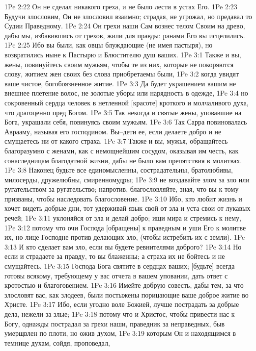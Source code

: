 1Pe 2:22  Он не сделал никакого греха, и не было лести в устах Его.
1Pe 2:23  Будучи злословим, Он не злословил взаимно; страдая, не угрожал, но предавал то Судии Праведному.
1Pe 2:24  Он грехи наши Сам вознес телом Своим на древо, дабы мы, избавившись от грехов, жили для правды: ранами Его вы исцелились.
1Pe 2:25  Ибо вы были, как овцы блуждающие (не имея пастыря), но возвратились ныне к Пастырю и Блюстителю душ ваших.
1Pe 3:1  Также и вы, жены, повинуйтесь своим мужьям, чтобы те из них, которые не покоряются слову, житием жен своих без слова приобретаемы были,
1Pe 3:2  когда увидят ваше чистое, богобоязненное житие.
1Pe 3:3  Да будет украшением вашим не внешнее плетение волос, не золотые уборы или нарядность в одежде,
1Pe 3:4  но сокровенный сердца человек в нетленной [красоте] кроткого и молчаливого духа, что драгоценно пред Богом.
1Pe 3:5  Так некогда и святые жены, уповавшие на Бога, украшали себя, повинуясь своим мужьям.
1Pe 3:6  Так Сарра повиновалась Аврааму, называя его господином. Вы--дети ее, если делаете добро и не смущаетесь ни от какого страха.
1Pe 3:7  Также и вы, мужья, обращайтесь благоразумно с женами, как с немощнейшим сосудом, оказывая им честь, как сонаследницам благодатной жизни, дабы не было вам препятствия в молитвах.
1Pe 3:8  Наконец будьте все единомысленны, сострадательны, братолюбивы, милосерды, дружелюбны, смиренномудры;
1Pe 3:9  не воздавайте злом за зло или ругательством за ругательство; напротив, благословляйте, зная, что вы к тому призваны, чтобы наследовать благословение.
1Pe 3:10  Ибо, кто любит жизнь и хочет видеть добрые дни, тот удерживай язык свой от зла и уста свои от лукавых речей;
1Pe 3:11  уклоняйся от зла и делай добро; ищи мира и стремись к нему,
1Pe 3:12  потому что очи Господа [обращены] к праведным и уши Его к молитве их, но лице Господне против делающих зло, (чтобы истребить их с земли).
1Pe 3:13  И кто сделает вам зло, если вы будете ревнителями доброго?
1Pe 3:14  Но если и страдаете за правду, то вы блаженны; а страха их не бойтесь и не смущайтесь.
1Pe 3:15  Господа Бога святите в сердцах ваших; [будьте] всегда готовы всякому, требующему у вас отчета в вашем уповании, дать ответ с кротостью и благоговением.
1Pe 3:16  Имейте добрую совесть, дабы тем, за что злословят вас, как злодеев, были постыжены порицающие ваше доброе житие во Христе.
1Pe 3:17  Ибо, если угодно воле Божией, лучше пострадать за добрые дела, нежели за злые;
1Pe 3:18  потому что и Христос, чтобы привести нас к Богу, однажды пострадал за грехи наши, праведник за неправедных, быв умерщвлен по плоти, но ожив духом,
1Pe 3:19  которым Он и находящимся в темнице духам, сойдя, проповедал,
